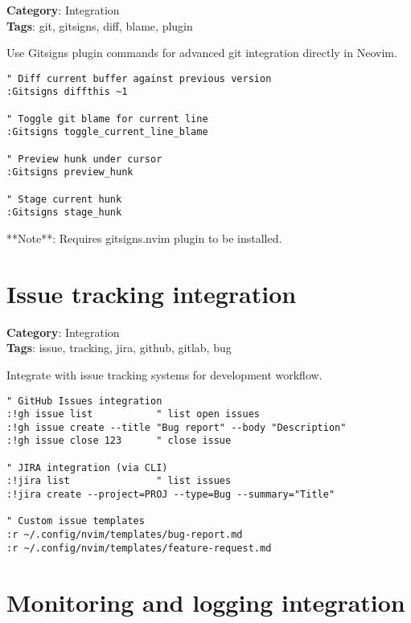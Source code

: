 {{{{{{\textbf{Category}: Integration\\ \textbf{Tags}: git, gitsigns, diff, blame, plugin
\vspace{0.5cm}

Use Gitsigns plugin commands for advanced git integration directly in Neovim.

\begin{Exa*}{}
\begin{Verbatim}[fontsize=\footnotesize, breaklines, breakanywhere]
" Diff current buffer against previous version
:Gitsigns diffthis ~1

" Toggle git blame for current line
:Gitsigns toggle_current_line_blame

" Preview hunk under cursor
:Gitsigns preview_hunk

" Stage current hunk
:Gitsigns stage_hunk
\end{Verbatim}
\end{Exa*}

**Note**: Requires gitsigns.nvim plugin to be installed.

\section{Issue tracking integration}

\textbf{Category}: Integration\\ \textbf{Tags}: issue, tracking, jira, github, gitlab, bug
\vspace{0.5cm}

Integrate with issue tracking systems for development workflow.

\begin{Exa*}{}
\begin{Verbatim}[fontsize=\footnotesize, breaklines, breakanywhere]
" GitHub Issues integration
:!gh issue list           " list open issues
:!gh issue create --title "Bug report" --body "Description"
:!gh issue close 123      " close issue

" JIRA integration (via CLI)
:!jira list               " list issues
:!jira create --project=PROJ --type=Bug --summary="Title"

" Custom issue templates
:r ~/.config/nvim/templates/bug-report.md
:r ~/.config/nvim/templates/feature-request.md
\end{Verbatim}
\end{Exa*}

\section{Monitoring and logging integration}

}}}}}}
